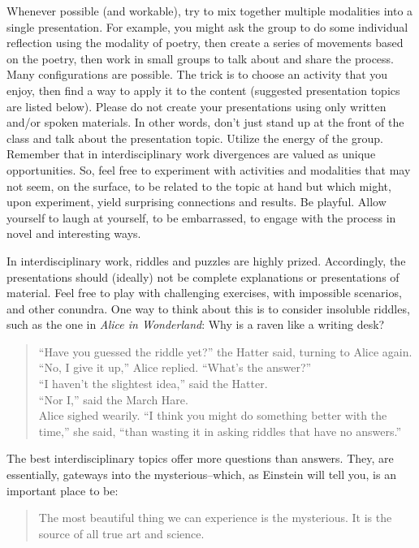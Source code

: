 \documentclass{report}
\begin{document}
 Whenever possible (and workable), try to mix together multiple
 modalities into a single presentation. For example, you might ask the
 group to do some individual reflection using the modality of poetry,
 then create a series of movements based on the poetry, then work in
 small groups to talk about and share the process. Many configurations
 are possible. The trick is to choose an activity that you enjoy, then
 find a way to apply it to the content (suggested presentation topics
 are listed below). Please do not create your presentations using only
 written and/or spoken materials. In other words, don't just stand up
 at the front of the class and talk about the presentation topic.
 Utilize the energy of the group. Remember that in interdisciplinary
 work divergences are valued as unique opportunities. So, feel free to
 experiment with activities and modalities that may not seem, on the
 surface, to be related to the topic at hand but which might, upon
 experiment, yield surprising connections and results. Be playful.
 Allow yourself to laugh at yourself, to be embarrassed, to engage
 with the process in novel and interesting ways.

In interdisciplinary work, riddles and puzzles are highly prized.
Accordingly, the presentations should (ideally) not be complete
explanations or presentations of material. Feel free to play with
challenging exercises, with impossible scenarios, and other conundra.
One way to think about this is to consider insoluble riddles, such as
the one in \textit{Alice in Wonderland}: Why is a raven like a
writing desk?

\begin{quote}
  ``Have you guessed the riddle yet?'' the Hatter said, turning to Alice again.\\
``No, I give it up,'' Alice replied. ``What's the answer?''\\
``I haven't the slightest idea,'' said the Hatter.\\
``Nor I,'' said the March Hare.\\
Alice sighed wearily. ``I think you might do something better with the time,'' she said, ``than wasting it in asking riddles that have no answers.''
\end{quote}

The best interdisciplinary topics offer more questions than answers.
They, are essentially, gateways into the mysterious--which, as
Einstein will tell you, is an important place to be:

\begin{quote}
  The most beautiful thing we can experience is the mysterious. It is
  the source of all true art and science.
\end{quote}
\end{document}
